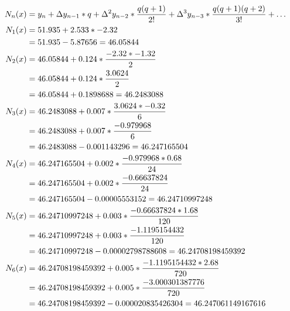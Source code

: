 \begin{align*}
    N_n(x) &
    = y_n
    + \Delta y_{n - 1} * q
    + \Delta \textsuperscript{2} y_{n - 2} * \frac{q(q + 1)}{2!}
    + \Delta \textsuperscript{3} y_{n - 3} * \frac{q(q + 1)(q + 2)}{3!}
    + \dots                                                                                 \\
    N_1(x) & = 51.935 + 2.533 * -2.32                                                       \\
           & = 51.935 - 5.87656 = 46.05844                                                  \\
    N_2(x) & = 46.05844 + 0.124 * \frac{-2.32 * -1.32}{2}                                   \\
           & = 46.05844 + 0.124 * \frac{3.0624}{2}                                          \\
           & = 46.05844 + 0.1898688 = 46.2483088                                            \\
    N_3(x) & = 46.2483088 + 0.007 * \frac{3.0624 * -0.32}{6}                                \\
           & = 46.2483088 + 0.007 * \frac{-0.979968}{6}                                     \\
           & = 46.2483088 - 0.001143296 = 46.247165504                                      \\
    N_4(x) & = 46.247165504 + 0.002 * \frac{-0.979968 * 0.68}{24}                           \\
           & = 46.247165504 + 0.002 * \frac{-0.66637824}{24}                                \\
           & = 46.247165504 - 0.00005553152 = 46.24710997248                                \\
    N_5(x) & = 46.24710997248 + 0.003 * \frac{-0.66637824 * 1.68}{120}                      \\
           & = 46.24710997248 + 0.003 * \frac{-1.1195154432}{120}                           \\
           & = 46.24710997248 - 0.00002798788608 = 46.24708198459392                        \\
    N_6(x) & = 46.24708198459392 + 0.005 * \frac{-1.1195154432 * 2.68}{720}                 \\
           & = 46.24708198459392 + 0.005 * \frac{-3.000301387776}{720}                      \\
           & = 46.24708198459392 - 0.000020835426304 = 46.247061149167616                   \\

\end{align*}
